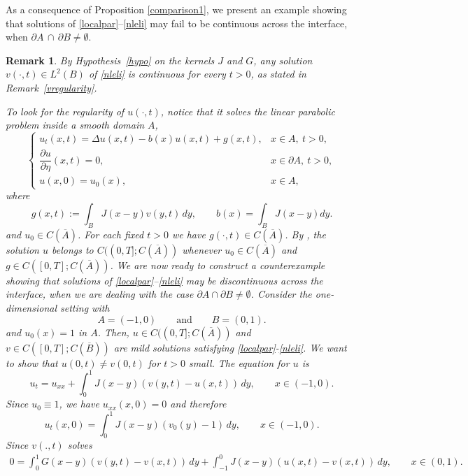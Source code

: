 \documentclass[reqno]{amsart}
\numberwithin{equation}{section}
\newtheorem{remark}[theorem]{Remark}
\begin{document}
As a consequence of Proposition \ref{comparison1}, we present an example showing that solutions of \eqref{localpar}--\eqref{nleli} may fail to be continuous across the interface, when $\partial A\,\cap\, \partial B\neq \emptyset.$

\begin{remark} {\rm
By Hypothesis~\ref{hypo} on the kernels $J$ and $G$, any solution 
$v(\cdot,t)\in L^2(B)$ of \eqref{nleli} is continuous for every $t>0$,  
as stated in Remark~\ref{vregularity}.  

To look for the regularity of $u(\cdot,t)$, notice that it solves the linear parabolic problem 
inside a smooth domain $A$,
 \begin{equation*}
\begin{cases}
u_t(x,t)
   = \Delta u(x,t)- b(x)u(x,t) + g(x,t),
   & x\in A,\ t>0,\\[0.4em]
\dfrac{\partial u}{\partial \eta}(x,t)=0,
   & x\in\partial A,\ t>0,\\[0.4em]
u(x,0)=u_0(x),
   & x\in A,
\end{cases}
\end{equation*}
where
\[
g(x,t)
   := \displaystyle\int_B J(x-y)v(y,t)\,dy
 , \qquad b(x)=\int_B J(x-y)dy.
\]
and $u_0\in C(\overline{A})$. For each fixed $t>0$ we have $g(\cdot,t)\in  C(\overline A)$. By \cite[Theorem~4.31]{Lunardi}, the solution $u$ belongs to
$C((0,T];C(\overline A))$ whenever $u_0\in C(\overline A)$ and 
$g\in C([0,T];C(\overline A))$.
\medskip
We are now ready to construct a counterexample showing that solutions of
\eqref{localpar}--\eqref{nleli} may be discontinuous across the interface, when we are dealing with the case
$\partial A\cap \partial B \neq \emptyset$.  
Consider the one-dimensional setting with
\[
A=(-1,0) \qquad \text{and} \qquad B=(0,1).
\]
and $u_0(x)=1$ in $A$. Then, $u\in C((0,T];C(\overline{A}))$ and $v\in C([0,T];C(\overline{B}))$ are mild solutions satisfying \eqref{localpar}-\eqref{nleli}. We want to show that $u(0,t)\neq v(0,t)$ for $t>0$ small. The equation for $u$ is
\[
u_t = u_{xx}+\int_0^1 J(x-y)(v(y,t)-u(x,t))\,dy, \qquad x\in (-1,0).
\]
Since $u_0\equiv1$, we have $u_{xx}(x,0)=0$ and therefore
\begin{equation}\label{u_t(x,0)}
u_t(x,0)=\int_0^1 J(x-y)(v_0(y)-1)\,dy, \qquad x\in (-1,0).
\end{equation}
Since $v(.,t)$ solves 
\begin{align}\label{v_0solves}
0=\int_0^1 G(x-y)(v(y,t)-v(x,t))\,dy
+\int_{-1}^0 J(x-y)(u(x,t)-v(x,t))\,dy, \qquad x\in (0,1).
\end{align}
}
\end{remark}
\end{document}

